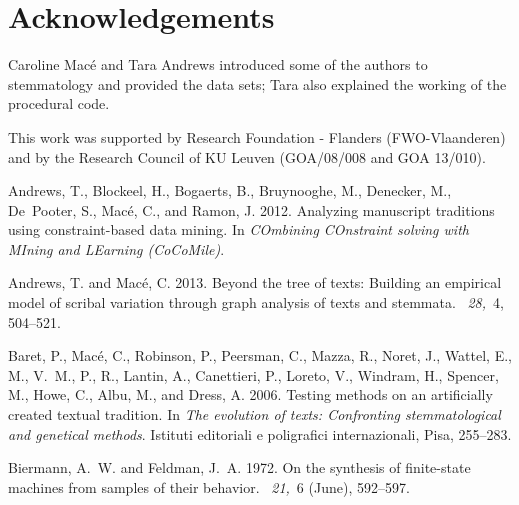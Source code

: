 \documentclass{tlp}
\renewcommand{\|}{\ensuremath{\,|\,}}
\renewcommand{\|}{\,|\,}
\begin{document}
\section*{Acknowledgements}
Caroline Mac\'e and Tara Andrews introduced some of the authors to
stemmatology and provided the data sets; Tara also explained the
working of the procedural code.

This work was supported by Research Foundation - Flanders
(FWO-Vlaanderen) and by the Research Council of KU Leuven (GOA/08/008
and GOA 13/010). 

% 
% 
\begin{thebibliography}{}

{\sc Andrews, T.}, {\sc Blockeel, H.}, {\sc Bogaerts, B.}, {\sc Bruynooghe,
  M.}, {\sc Denecker, M.}, {\sc De~Pooter, S.}, {\sc Mac{\'e}, C.}, {\sc and}
  {\sc Ramon, J.} 2012.
\newblock Analyzing manuscript traditions using constraint-based data mining.
\newblock In {\em COmbining COnstraint solving with MIning and LEarning
  (CoCoMile)}.

{\sc Andrews, T.} {\sc and} {\sc Mac\'e, C.} 2013.
\newblock Beyond the tree of texts: Building an empirical model of scribal
  variation through graph analysis of texts and stemmata.
~{\em 28,\/}~4, 504--521.

{\sc Baret, P.}, {\sc Mac\'e, C.}, {\sc Robinson, P.}, {\sc Peersman, C.}, {\sc
  Mazza, R.}, {\sc Noret, J.}, {\sc Wattel, E.}, {\sc M., V.~M.}, {\sc P., R.},
  {\sc Lantin, A.}, {\sc Canettieri, P.}, {\sc Loreto, V.}, {\sc Windram, H.},
  {\sc Spencer, M.}, {\sc Howe, C.}, {\sc Albu, M.}, {\sc and} {\sc Dress, A.}
  2006.
\newblock Testing methods on an artificially created textual tradition.
\newblock In {\em The evolution of texts: Confronting stemmatological and
  genetical methods}. Istituti editoriali e poligrafici internazionali, Pisa,
  255--283.

{\sc Biermann, A.~W.} {\sc and} {\sc Feldman, J.~A.} 1972.
\newblock On the synthesis of finite-state machines from samples of their
  behavior.
~{\em 21,\/}~6 (June), 592--597.


\end{thebibliography}
\end{document}
